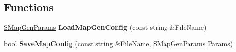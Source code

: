 \subsection*{Functions}
\begin{DoxyCompactItemize}
\item 
\hypertarget{namespace_chase_game_a4779af792d3de8e274049bf2019e0343}{\hyperlink{struct_chase_game_1_1_s_map_gen_params}{S\-Map\-Gen\-Params} {\bfseries Load\-Map\-Gen\-Config} (const string \&File\-Name)}\label{namespace_chase_game_a4779af792d3de8e274049bf2019e0343}

\item 
\hypertarget{namespace_chase_game_a82459ef7713cba867b28c4a032641167}{bool {\bfseries Save\-Map\-Config} (const string \&File\-Name, \hyperlink{struct_chase_game_1_1_s_map_gen_params}{S\-Map\-Gen\-Params} Params)}\label{namespace_chase_game_a82459ef7713cba867b28c4a032641167}


\end{DoxyCompactItemize}
